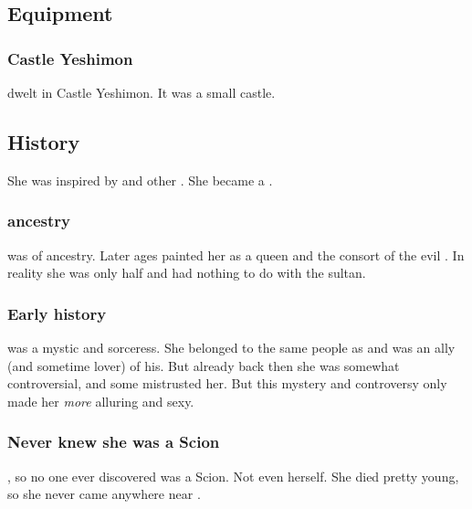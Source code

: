 \subsection{Equipment}





\subsubsection{Castle Yeshimon}
\Delphine dwelt in Castle Yeshimon. 
It was a small castle. 









\subsection{History}
She was inspired by  and other \qliphoth. 
She became a . 





\subsubsection{\Sarun ancestry}
\Delphine was of  ancestry.
Later ages painted her as a \Sarun queen and the consort of the evil . 
In reality she was only half \Sarun and had nothing to do with the sultan.





\subsubsection{Early history}
\Delphine{} was a mystic and sorceress. 
She belonged to the same people as  and was an ally (and sometime lover) of his. 
But already back then she was somewhat controversial, and some mistrusted her. 
But this mystery and controversy only made her \emph{more} alluring and sexy. 





\subsubsection{Never knew she was a Scion}
, so no one ever discovered \Delphine{} was a Scion. 
Not even \Delphine{} herself. 
She died pretty young, so she never came anywhere near \Apotheosis. 






